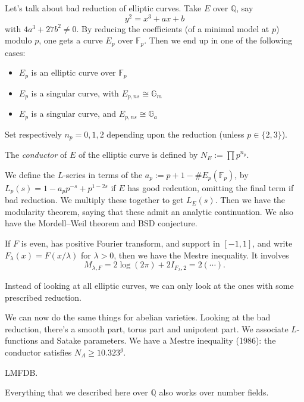 \documentclass[reqno]{amsart} 
\begin{document}
Let's talk about bad reduction of elliptic curves.  Take $E$ over $\mathbb{Q}$, say
\begin{equation*}
  y^2 = x^3 + a x + b
\end{equation*}
with $4 a^3 + 27 b^2 \neq 0$.  By reducing the coefficients (of a minimal model at $p$) modulo $p$, one gets a curve $E_p$ over $\mathbb{F}_p$.  Then we end up in one of the following cases:
\begin{itemize}
\item $E_p$ is an elliptic curve over $\mathbb{F}_p$
\item $E_p$ is a singular curve, with $E_{p, n s} \cong \mathbb{G}_m$
\item $E_p$ is a singular curve, and $E_{p, ns} \cong \mathbb{G}_a$
\end{itemize}
Set respectively $n_p = 0, 1, 2$ depending upon the reduction (unless $p \in \{2,3\}$).

The \emph{conductor} of $E$ of the elliptic curve is defined by $N_E := \prod p^{n_p}$.

We define the $L$-series in terms of the $a_p := p + 1 - \# E_p(\mathbb{F}_p)$, by $L_p(s) = 1 - a_p p^{- s} + p^{1 - 2 s}$ if $E$ has good redcution, omitting the final term if bad reduction.  We multiply these together to get $L_E(s)$.  Then we have the modularity theorem, saying that these admit an analytic continuation.  We also have the Mordell--Weil theorem and BSD conjecture.

If $F$ is even, has positive Fourier transform, and support in $[-1, 1]$, and write $F_\lambda(x) = F(x / \lambda)$ for $\lambda > 0$, then we have the Mestre inequality.  It involves
\begin{equation*}
  M_{\lambda, F} = 2 \log(2 \pi) + 2 I_{F_\lambda, 2} = 2 \left( \dotsb \right).
\end{equation*}

Instead of looking at all elliptic curves, we can only look at the ones with some prescribed reduction.

We can now do the same things for abelian varieties.  Looking at the bad reduction, there's a smooth part, torus part and unipotent part.  We associate $L$-functions and Satake parameters.  We have a Mestre inequality (1986): the conductor satisfies $N_A \geq 10.323^g$.

LMFDB.

Everything that we described here over $\mathbb{Q}$ also works over number fields.{} 
\end{document}
